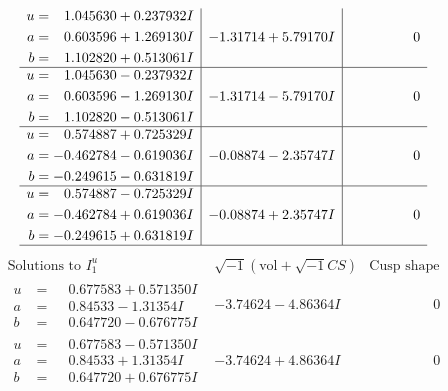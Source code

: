 \documentclass[1p]{elsarticle_modified}
\theoremstyle{definition}
\newcommand{\I}{\sqrt{-1}}
\begin{document}
$$\begin{array}{c|c|c}
\begin{aligned}
u &= \phantom{-}1.045630 + 0.237932 I \\
a &= \phantom{-}0.603596 + 1.269130 I \\
b &= \phantom{-}1.102820 + 0.513061 I\end{aligned}
 & -1.31714 + 5.79170 I & \phantom{-0.000000 } 0 \\ \hline\begin{aligned}
u &= \phantom{-}1.045630 - 0.237932 I \\
a &= \phantom{-}0.603596 - 1.269130 I \\
b &= \phantom{-}1.102820 - 0.513061 I\end{aligned}
 & -1.31714 - 5.79170 I & \phantom{-0.000000 } 0 \\ \hline\begin{aligned}
u &= \phantom{-}0.574887 + 0.725329 I \\
a &= -0.462784 - 0.619036 I \\
b &= -0.249615 - 0.631819 I\end{aligned}
 & -0.08874 - 2.35747 I & \phantom{-0.000000 } 0 \\ \hline\begin{aligned}
u &= \phantom{-}0.574887 - 0.725329 I \\
a &= -0.462784 + 0.619036 I \\
b &= -0.249615 + 0.631819 I\end{aligned}
 & -0.08874 + 2.35747 I & \phantom{-0.000000 } 0\\
 \hline 
 \end{array}$$\newpage$$\begin{array}{c|c|c}  
\text{Solutions to }I^u_{1}& \I (\text{vol} + \sqrt{-1}CS) & \text{Cusp shape}\\
 \hline 
\begin{aligned}
u &= \phantom{-}0.677583 + 0.571350 I \\
a &= \phantom{-}0.84533 - 1.31354 I \\
b &= \phantom{-}0.647720 - 0.676775 I\end{aligned}
 & -3.74624 - 4.86364 I & \phantom{-0.000000 } 0 \\ \hline\begin{aligned}
u &= \phantom{-}0.677583 - 0.571350 I \\
a &= \phantom{-}0.84533 + 1.31354 I \\
b &= \phantom{-}0.647720 + 0.676775 I\end{aligned}
 & -3.74624 + 4.86364 I & \phantom{-0.000000 } 0 \\ \hline\begin{aligned}

\end{aligned}
\end{array}$$
\end{document}
